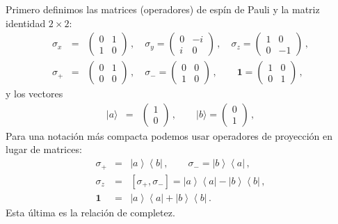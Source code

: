 \documentclass[twocolumn,aps,eqsecnum]{revtex4}
\providecommand{\ket}[1]{\lvert #1 \rangle}
\newcommand{\ketbra}[2]{\left| {#1} \right\rangle\left\langle {#2}\right|}
\begin{document}
Primero definimos las matrices (operadores) de esp\'in de Pauli y la matriz 
identidad $2 \times 2$:
%
\begin{eqnarray*}
\sigma_x &=& \left( \begin{array}{cc}  0&1 \\ 1&0 \end{array} \right) \,, 
\quad \sigma_y = \left( \begin{array}{cc} 
	0&-i \\ i&0 \end{array} \right) \,, 	\quad 
\sigma_z =\left( \begin{array}{cc} 1&0 \\ 0&-1 \end{array} \right) \,, \\
\sigma_+ &=& \left( \begin{array}{cc} 0&1 \\ 0&0 \end{array} \right) \,, 
\quad \sigma_- = \left( \begin{array}{cc} 
	0&0 \\ 1&0 \end{array} \right) \,, 
\qquad \mathbf{1} = \left( \begin{array}{cc} 
	1&0 \\ 0&1 \end{array} \right) \,,
\end{eqnarray*}
y los vectores 
%
\begin{eqnarray*}
\ket{a} &=& \left( \begin{array}{c}  1 \\ 0 \end{array} \right) \,, \qquad 
\ket{b} = \left( \begin{array}{c}  0 \\ 1 \end{array} \right) \,, 
\end{eqnarray*}
Para una notaci\'on m\'as compacta podemos usar operadores de proyecci\'on 
en lugar de matrices: 
%
\begin{eqnarray*}
\sigma_+ &=& \ketbra{a}{b} \,, 	\qquad 
	\sigma_- = \ketbra{b}{a} \,, 	\\ 
\sigma_z &=& [\sigma_+, \sigma_-]   
	= \ketbra{a}{a} - \ketbra{b}{b} 	\,, \\ 
\mathbf{1} &=& \ketbra{a}{a} + \ketbra{b}{b} \,.	
\end{eqnarray*}
Esta \'ultima es la relaci\'on de completez.  
\end{document}
